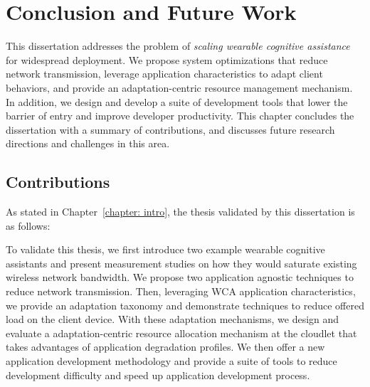 \chapter{Conclusion and Future Work}
\label{chapter: conclusion}

This dissertation addresses the problem of \textit{scaling wearable cognitive
assistance} for widespread deployment. We propose system optimizations that
reduce network transmission, leverage application characteristics to adapt
client behaviors, and provide an adaptation-centric resource management
mechanism. In addition, we design and develop a suite of development tools that
lower the barrier of entry and improve developer productivity. This chapter
concludes the dissertation with a summary of contributions, and discusses future
research directions and challenges in this area.

\section{Contributions}

As stated in Chapter~\ref{chapter: intro}, the thesis validated by this
dissertation is as follows:

\noindent{}

To validate this thesis, we first introduce two example wearable cognitive
assistants and present measurement studies on how they would saturate existing
wireless network bandwidth. We propose two application agnostic techniques to
reduce network transmission. Then, leveraging WCA application characteristics,
we provide an adaptation taxonomy and demonstrate techniques to reduce offered
load on the client device. With these adaptation mechanisms, we design and
evaluate a adaptation-centric resource allocation mechanism at the cloudlet
that takes advantages of application degradation profiles. We then offer
a new application development methodology and provide a suite of tools to reduce
development difficulty and speed up application development process.

